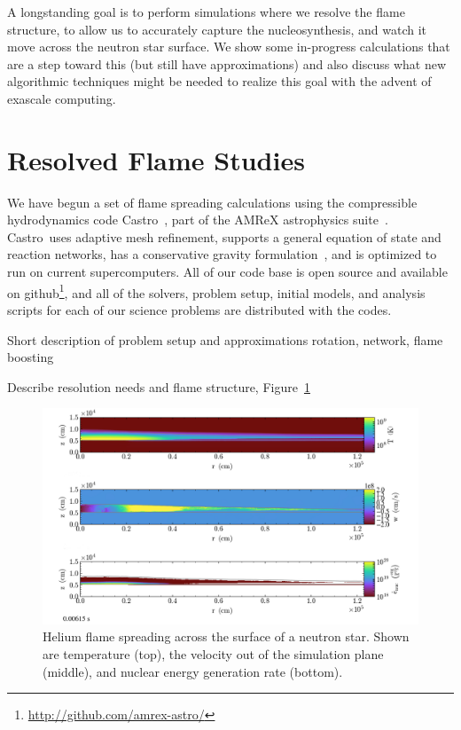 \documentclass[a4paper]{jpconf}
\newcommand{\castro}{{\sffamily Castro}}
\newcommand{\MarginPar}[1]{\marginpar{\vskip-\baselineskip\raggedright\tiny\sffamily\hrule\smallskip{\color{red}#1}\par\smallskip\hrule}}
\begin{document}
A longstanding goal is to perform simulations where we resolve the
flame structure, to allow us to accurately capture the
nucleosynthesis, and watch it move across the neutron star surface.
We show some in-progress calculations that are a step toward this (but
still have approximations) and also discuss what new algorithmic
techniques might be needed to realize this goal with the advent of
exascale computing.



\section{Resolved Flame Studies}

We have begun a set of flame spreading calculations using the
compressible hydrodynamics code Castro~\cite{castro}, part of the
AMReX astrophysics suite~\cite{astronum:2017}.  \castro\ uses adaptive
mesh refinement, supports a general equation of state and reaction
networks, has a conservative gravity formulation~\cite{wdmergerI}, and
is optimized to run on current supercomputers.  All of our code base
is open source and available on
github\footnote{\url{http://github.com/amrex-astro/}}, and all of the
solvers, problem setup, initial models, and analysis scripts for each
of our science problems are distributed with the codes.

Short description of problem setup and approximations
rotation, network, flame boosting

Describe resolution needs and flame structure, Figure~\ref{fig:xrb} \MarginPar{Mike will update this}


\begin{figure}
\centering
\includegraphics[width=0.75\linewidth]{xrb}
\caption{\label{fig:xrb} Helium flame spreading across the surface of
  a neutron star.  Shown are temperature (top), the velocity out of the
  simulation plane (middle), and nuclear energy generation rate
  (bottom).  }
\end{figure}
\end{document}
